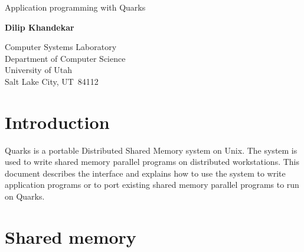 

\setlength{\textheight}{9true in}
\setlength{\textwidth}{6.25true in}
\setlength{\topmargin}{-.43true in}
\setlength{\headheight}{.17true in}
\setlength{\headsep}{.25true in}
\setlength{\footheight}{.17true in}
\setlength{\footskip}{.42true in}
\setlength{\topskip}{12pt}
\setlength{\parskip}{4 mm}
\setlength{\parindent}{9 mm}
\setlength{\oddsidemargin}{0.25true in}
\if@twoside\setlength{\evensidemargin}{0true in}
	\else\setlength{\evensidemargin}{0.25true in}\fi





\begin{center}
{\LARGE Application programming with Quarks}

\vspace*{10 mm}

{\bf Dilip Khandekar} \\
\vspace*{5 mm}
\begin{em}
Computer Systems Laboratory \\
Department of Computer Science \\
University of Utah \\
Salt Lake City, UT~84112
\end{em}

\end{center}

\def\mysec#1{{\section{#1}\vspace*{-7 mm}}}
\def\mysubsec#1{{\subsection{#1}\vspace*{-7 mm}}}

\mysec{Introduction}
 
Quarks is a portable Distributed Shared Memory system on Unix. 
The system is used to write shared memory parallel programs
on distributed workstations. This document describes the
interface and explains how to use the system to write application
programs or to port existing shared memory parallel programs to run on
Quarks. 

\mysec{Shared memory}
 
